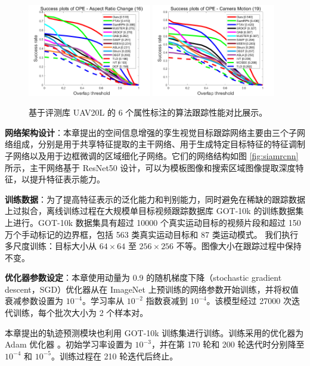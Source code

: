 \begin{figure}[t!]
\begin{center}
	\includegraphics[width=0.48\textwidth]{Img/globally/UAV20L/ARC_overlap_OPE_AUC.png}
	\includegraphics[width=0.48\textwidth]{Img/globally/UAV20L/CM_overlap_OPE_AUC.png}
\end{center}
   \caption{基于评测库 UAV20L \cite{mueller2016benchmark} 的 6 个属性标注的算法跟踪性能对比展示。}
\label{fig:globally_uav20l_1}
\end{figure}

\textbf{网络架构设计}：本章提出的空间信息增强的孪生视觉目标跟踪网络主要由三个子网络组成，分别是用于共享特征提取的主干网络、用于生成特定目标特征的特征调制子网络以及用于边框微调的区域细化子网络。它们的网络结构如图 \ref{fig:siamrcnn} 所示，主干网络基于 ResNet50 设计，可以为模板图像和搜索区域图像提取深度特征，以提升特征表示能力。

\textbf{训练数据}：为了提高特征表示的泛化能力和判别能力，同时避免在稀缺的跟踪数据上过拟合，离线训练过程在大规模单目标视频跟踪数据库 GOT-10k \cite{GOT-10k} 的训练数据集上进行。GOT-10k 数据集具有超过 10000 个真实运动目标的视频片段和超过 150 万个手动标记的边界框，包括 563 类真实运动目标和 87 类运动模式。
我们执行多尺度训练：目标大小从 $64 \times 64$ 至 $256 \times 256$ 不等。图像大小在跟踪过程中保持不变。

\textbf{优化器参数设定}：本章使用动量为 0.9 的随机梯度下降（stochastic gradient descent，SGD）优化器从在 ImageNet 上预训练的网络参数开始训练，并将权值衰减参数设置为 $10^{-4}$。学习率从 $10^{-2}$ 指数衰减到 $10^{-4}$。该模型经过 27000 次迭代训练，每个批次大小为 2 个样本对。

本章提出的轨迹预测模块也利用 GOT-10k 训练集进行训练。训练采用的优化器为 Adam 优化器 \cite{kingma2014adam}。初始学习率设置为 $10^{-3}$，并在第 170 轮和 200 轮迭代时分别降至 $10^{-4}$ 和 $10^{-5}$。训练过程在 210 轮迭代后终止。

